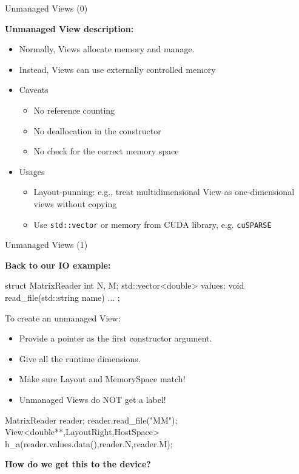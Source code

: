 \begin{frame}[fragile]{Unmanaged Views (0)}

  \textbf{Unmanaged View description:}

  \vspace{5pt}
  \begin{itemize}
    \item{Normally, Views allocate memory and manage.}
    \item{Instead, Views can use externally controlled memory}
    \pause
    \item{Caveats}
    \begin{itemize}
      \item{No reference counting}
      \item{No deallocation in the constructor}
      \item{No check for the correct memory space}
    \end{itemize}
    \item{Usages}
    \begin{itemize}
      \item{Layout-punning: e.g., treat multidimensional View as one-dimensional views without copying}
      \item{Use \texttt{std::vector} or memory from CUDA library, e.g. \texttt{cuSPARSE}}
    \end{itemize}
  \end{itemize}

\end{frame}


\begin{frame}[fragile]{Unmanaged Views (1)}

  \textbf{Back to our IO example:}
  \begin{code}[keywords={int,vector,string,double}]
struct MatrixReader {
  int N, M;
  std::vector<double> values;
  void read_file(std::string name) {...}
};
  \end{code}
  
  To create an unmanaged View:
  \begin{itemize}
   \item Provide a pointer as the first constructor argument.
   \item Give all the runtime dimensions.
   \item Make sure Layout and MemorySpace match!
   \item Unmanaged Views do NOT get a label!
  \end{itemize}

  \pause
  \begin{code}[keywords={View,double,LayoutRight,HostSpace,MemoryTraits,Unmanaged}]
MatrixReader reader; reader.read_file("MM");
View<double**,LayoutRight,HostSpace>
  h_a(reader.values.data(),reader.N,reader.M);
  \end{code}

  \pause
  \textbf{How do we get this to the device?}

\end{frame}

